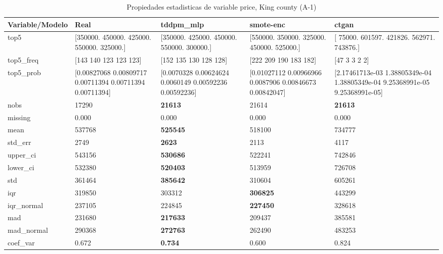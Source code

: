 \begin{table}[H]
\centering
\fontsize{8}{14}\selectfont
\caption{Propiedades  estadisticas de variable price, King county (A-1)}
\label{table-stats-king county-a-1-price}
\begin{tabular}{|l|m{10em}|m{10em}|m{10em}|m{10em}|}
\hline
 \rowcolor[gray]{0.8}
Variable/Modelo & Real & tddpm\_mlp & smote-enc & ctgan \\
\hline top5 & [350000. 450000. 425000. 550000. 325000.] & [350000. 425000. 450000. 550000. 300000.] & [550000. 350000. 325000. 450000. 525000.] & [ 75000. 601597. 421826. 562971. 743876.] \\
\hline top5\_freq & [143 140 123 123 123] & [152 135 130 128 128] & [222 209 190 183 182] & [47  3  3  2  2] \\
\hline top5\_prob & [0.00827068 0.00809717 0.00711394 0.00711394 0.00711394] & [0.0070328  0.00624624 0.0060149  0.00592236 0.00592236] & [0.01027112 0.00966966 0.0087906  0.00846673 0.00842047] & [2.17461713e-03 1.38805349e-04 1.38805349e-04 9.25368991e-05
 9.25368991e-05] \\
\hline nobs & 17290 & \bfseries 21613 & \cellcolor[rgb]{0.9, 0.54, 0.52} 21614 & \bfseries 21613 \\
\hline missing & 0.000 & 0.000 & 0.000 & 0.000 \\
\hline mean & 537768 & \bfseries 525545 & 518100 & \cellcolor[rgb]{0.9, 0.54, 0.52} 734777 \\
\hline std\_err & 2749 & \bfseries 2623 & 2113 & \cellcolor[rgb]{0.9, 0.54, 0.52} 4117 \\
\hline upper\_ci & 543156 & \bfseries 530686 & 522241 & \cellcolor[rgb]{0.9, 0.54, 0.52} 742846 \\
\hline lower\_ci & 532380 & \bfseries 520403 & 513959 & \cellcolor[rgb]{0.9, 0.54, 0.52} 726708 \\
\hline std & 361464 & \bfseries 385642 & 310604 & \cellcolor[rgb]{0.9, 0.54, 0.52} 605261 \\
\hline iqr & 319850 & 303312 & \bfseries 306825 & \cellcolor[rgb]{0.9, 0.54, 0.52} 443299 \\
\hline iqr\_normal & 237105 & 224845 & \bfseries 227450 & \cellcolor[rgb]{0.9, 0.54, 0.52} 328618 \\
\hline mad & 231680 & \bfseries 217633 & 209437 & \cellcolor[rgb]{0.9, 0.54, 0.52} 385581 \\
\hline mad\_normal & 290368 & \bfseries 272763 & 262490 & \cellcolor[rgb]{0.9, 0.54, 0.52} 483253 \\
\hline coef\_var & 0.672 & \bfseries 0.734 & 0.600 & \cellcolor[rgb]{0.9, 0.54, 0.52} 0.824 \\

\end{tabular}
\end{table}
